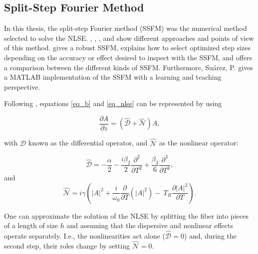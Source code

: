     \subsection{Split-Step Fourier Method}

        In this thesis, the split-step Fourier method (SSFM) was the numerical method selected to solve the NLSE. \citep{AgrawalBook}, \citep{sinkin}, \citep{robust},  and \citep{HohageSchmidt2002} show different approaches and points of view of this method.  \citep{robust} gives a robust SSFM,  \citep{sinkin} explains how to select optimized step sizes depending on the accuracy or effect desired to inspect with the SSFM, and  \citep{HohageSchmidt2002} offers a comparison between the different kinds of SSFM. Furthermore, Suárez, P. \citep{suarez} gives a MATLAB implementation of the SSFM with a learning and teaching perspective. 
        
        Following \citep{AgrawalBook}, equations \eqref{eq_b} and \eqref{eq_nlse} can be represented by using
    
        \begin{equation}\label{eq_dpn}
            \frac{\partial A}{\partial z} = \left( \hat{\mathcal{D}} + \hat{\mathcal{N}} \right) A, 
        \end{equation}
        
        with $\hat{\mathcal{D}}$ known as the differential operator, and $\hat{\mathcal{N}}$ as the nonlinear operator: 
        
        \begin{equation} \label{eq_dhat}
            \hat{\mathcal{D}} = -\frac{\alpha}{2} - \frac{i \beta_2}{2} \frac{\partial^2 }{\partial T^2} +\frac{\beta_3}{6} \frac{\partial^3 }{\partial T^3},
        \end{equation}
        and
        \begin{equation} \label{eq_nhat}
             \hat{\mathcal{N}} = i \gamma   \left(\left|A\right|^2+ \frac{i}{\omega_0} \frac{\partial}{\partial T} (\left| A\right|^2)-  \ T_R \frac{\partial \left|A \right|^2}{\partial T} \right).
        \end{equation}
        
        One can approximate the solution of the NLSE by splitting the fiber into pieces of a length of size $h$ and assuming that the dispersive and nonlinear effects operate separately. I.e., the nonlinearities act alone ($\hat{\mathcal{D}} = 0$) and, during the second step, their roles change by setting $\hat{\mathcal{N}} = 0$.

